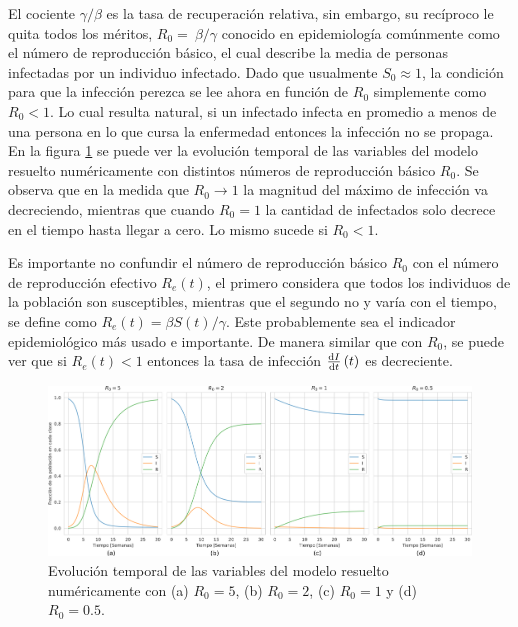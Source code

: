 El cociente $\gamma/\beta$ es la tasa de recuperación relativa, sin embargo, su recíproco le quita todos los méritos, $R_0=~\beta/\gamma$ 
conocido en epidemiología comúnmente como el número de reproducción básico, el cual describe la media de personas infectadas por un individuo 
infectado. Dado que usualmente $S_0\approx 1$, la condición para que la infección perezca se lee ahora en función de $R_0$
simplemente como $R_0 < 1$. Lo cual resulta natural, si un infectado infecta en promedio a menos de una persona en lo que cursa la enfermedad entonces 
la infección no se propaga. En la figura \ref{fig:SIR_R} se puede ver la evolución temporal de las variables del modelo resuelto numéricamente con distintos 
números de reproducción básico $R_0$. Se observa que en la medida que $R_0 \to 1$ la magnitud del máximo de infección va decreciendo, mientras que cuando $R_0 = 1$ la 
cantidad de infectados solo decrece en el tiempo hasta llegar a cero. Lo mismo sucede si $R_0<1$.

Es importante no confundir el número de reproducción básico $R_0$ con el número de reproducción efectivo $R_e(t)$, el primero considera que todos los individuos de la 
población son susceptibles, mientras que el segundo no y varía con el tiempo, se define como $R_e(t)=\beta S(t)/\gamma$. Este probablemente sea el indicador epidemiológico 
más usado e importante. De manera similar que con $R_0$, se puede ver que si $R_e(t) < 1$ entonces la tasa de infección $\dv{I}{t}\left(t\right)$ es decreciente.

\begin{figure}[h]
  \centering
  \includegraphics[width=\imsizeL]{SIR_R.png}
  \caption[Solución numérica del modelo S-I-R con distintos valores de $R_0$]{Evolución temporal de las variables del modelo resuelto numéricamente con (a) 
  $R_0 = 5$, (b) $R_0 = 2$, (c) $R_0 = 1$ y (d) $R_0 = 0.5$.}
  \label{fig:SIR_R}
\end{figure}

